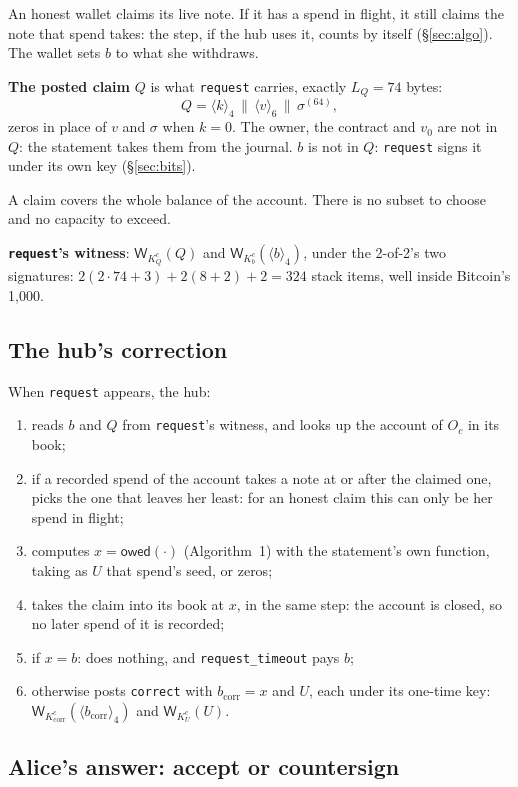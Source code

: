 \documentclass[11pt]{article}
\theoremstyle{plain}
\theoremstyle{definition}
\newcommand{\bcorr}{b_{\mathrm{corr}}}
\newcommand{\tx}[1]{\texttt{#1}}
\newcommand{\be}[2]{\langle #1\rangle_{#2}}
\newcommand{\Wots}{\mathsf{W}}
\newcommand{\owed}{\mathsf{owed}}
\newcommand{\Oc}{O_c}
\newcommand{\KQ}{K_{Q}^{c}}
\newcommand{\Kb}{K_{b}^{c}}
\newcommand{\Kcorr}{K_{\mathrm{corr}}^{c}}
\newcommand{\KU}{K_{U}^{c}}
\begin{document}
An honest wallet claims its live note. If it has a spend in flight, it
still claims the note that spend takes: the step, if the hub uses it,
counts by itself (\S\ref{sec:algo}). The wallet sets $b$ to what she
withdraws.

\textbf{The posted claim} $Q$ is what \tx{request} carries, exactly
$L_Q = 74$ bytes:
\[
  Q = \be{k}{4} \,\|\, \be{v}{6} \,\|\, \sigma^{(64)},
\]
zeros in place of $v$ and $\sigma$ when $k = 0$. The owner, the contract
and $v_0$ are not in $Q$: the statement takes them from the journal.
$b$ is not in $Q$: \tx{request} signs it under its own key
(\S\ref{sec:bits}).

A claim covers the whole balance of the account. There is no subset to
choose and no capacity to exceed.

\textbf{\tx{request}'s witness}: $\Wots_{\KQ}(Q)$ and
$\Wots_{\Kb}(\be{b}{4})$, under the 2-of-2's two signatures: $2(2 \cdot
74 + 3) + 2(8 + 2) + 2 = 324$ stack items, well inside Bitcoin's 1,000.

\subsection{The hub's correction}\label{sec:correct}

When \tx{request} appears, the hub:
\begin{enumerate}[nosep]
\item reads $b$ and $Q$ from \tx{request}'s witness, and looks up the
  account of $\Oc$ in its book;
\item if a recorded spend of the account takes a note at or after the
  claimed one, picks the one that leaves her least: for an honest claim
  this can only be her spend in flight;
\item computes $x = \owed(\cdot)$ (Algorithm~1) with the statement's own
  function, taking as $U$ that spend's seed, or zeros;
\item takes the claim into its book at $x$, in the same step: the
  account is closed, so no later spend of it is recorded;
\item if $x = b$: does nothing, and \tx{request\_timeout} pays $b$;
\item otherwise posts \tx{correct} with $\bcorr = x$ and $U$, each under
  its one-time key: $\Wots_{\Kcorr}(\be{\bcorr}{4})$ and
  $\Wots_{\KU}(U)$.
\end{enumerate}

\subsection{Alice's answer: accept or countersign}\label{sec:ack}
\end{document}
